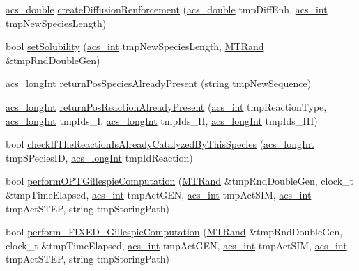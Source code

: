 \begin{DoxyCompactItemize}
\item 
\hyperlink{a00072_ab776853a005fcbf56af0424a2a4dd607}{acs\-\_\-double} \hyperlink{a00014_af795a4d1f04dfbfcbdf321e20e74f9c2}{create\-Diffusion\-Renforcement} (\hyperlink{a00072_ab776853a005fcbf56af0424a2a4dd607}{acs\-\_\-double} tmp\-Diff\-Enh, \hyperlink{a00072_a8d277355641a098190360234e2ebde35}{acs\-\_\-int} tmp\-New\-Species\-Length)
\item 
bool \hyperlink{a00014_a496ba50d3a345cd842ce42406946405c}{set\-Solubility} (\hyperlink{a00072_a8d277355641a098190360234e2ebde35}{acs\-\_\-int} tmp\-New\-Species\-Length, \hyperlink{a00016}{M\-T\-Rand} \&tmp\-Rnd\-Double\-Gen)
\item 
\hyperlink{a00072_a19319d75f02db4308bc5c0026d98cd85}{acs\-\_\-long\-Int} \hyperlink{a00014_a4e26cc574e20a5afcfbbe5887109c5af}{return\-Pos\-Species\-Already\-Present} (string tmp\-New\-Sequence)
\item 
\hyperlink{a00072_a19319d75f02db4308bc5c0026d98cd85}{acs\-\_\-long\-Int} \hyperlink{a00014_a6feec5685b519ba0cdae0e5c59dffff0}{return\-Pos\-Reaction\-Already\-Present} (\hyperlink{a00072_a8d277355641a098190360234e2ebde35}{acs\-\_\-int} tmp\-Reaction\-Type, \hyperlink{a00072_a19319d75f02db4308bc5c0026d98cd85}{acs\-\_\-long\-Int} tmp\-Ids\-\_\-\-I, \hyperlink{a00072_a19319d75f02db4308bc5c0026d98cd85}{acs\-\_\-long\-Int} tmp\-Ids\-\_\-\-I\-I, \hyperlink{a00072_a19319d75f02db4308bc5c0026d98cd85}{acs\-\_\-long\-Int} tmp\-Ids\-\_\-\-I\-I\-I)
\item 
bool \hyperlink{a00014_ac4c90b07b8e75ea03e2ced0ea644a69f}{check\-If\-The\-Reaction\-Is\-Already\-Catalyzed\-By\-This\-Species} (\hyperlink{a00072_a19319d75f02db4308bc5c0026d98cd85}{acs\-\_\-long\-Int} tmp\-S\-Pecies\-I\-D, \hyperlink{a00072_a19319d75f02db4308bc5c0026d98cd85}{acs\-\_\-long\-Int} tmp\-Id\-Reaction)
\item 
bool \hyperlink{a00014_a90fba3b2cc589f32c97a74540620bd84}{perform\-O\-P\-T\-Gillespie\-Computation} (\hyperlink{a00016}{M\-T\-Rand} \&tmp\-Rnd\-Double\-Gen, clock\-\_\-t \&tmp\-Time\-Elapsed, \hyperlink{a00072_a8d277355641a098190360234e2ebde35}{acs\-\_\-int} tmp\-Act\-G\-E\-N, \hyperlink{a00072_a8d277355641a098190360234e2ebde35}{acs\-\_\-int} tmp\-Act\-S\-I\-M, \hyperlink{a00072_a8d277355641a098190360234e2ebde35}{acs\-\_\-int} tmp\-Act\-S\-T\-E\-P, string tmp\-Storing\-Path)
\item 
bool \hyperlink{a00014_aa4fba7d5679a16fd6ef1a9a2041779a2}{perform\-\_\-\-F\-I\-X\-E\-D\-\_\-\-Gillespie\-Computation} (\hyperlink{a00016}{M\-T\-Rand} \&tmp\-Rnd\-Double\-Gen, clock\-\_\-t \&tmp\-Time\-Elapsed, \hyperlink{a00072_a8d277355641a098190360234e2ebde35}{acs\-\_\-int} tmp\-Act\-G\-E\-N, \hyperlink{a00072_a8d277355641a098190360234e2ebde35}{acs\-\_\-int} tmp\-Act\-S\-I\-M, \hyperlink{a00072_a8d277355641a098190360234e2ebde35}{acs\-\_\-int} tmp\-Act\-S\-T\-E\-P, string tmp\-Storing\-Path)

\end{DoxyCompactItemize}
